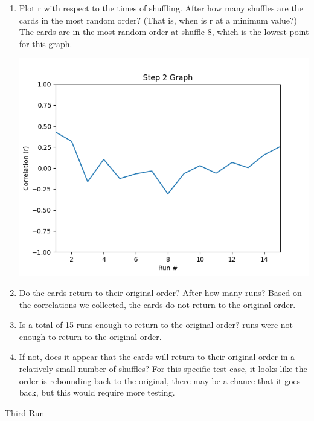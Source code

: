 \documentclass[12pt]{article}
\begin{document}
    \begin{enumerate}
        \item Plot r with respect to the times of shuffling. After how many shuffles are the cards 
        in the most random order? (That is, when is r at a minimum value?)
        \subitem The cards are in the most random order at shuffle 8, which is the lowest point for this graph.\\
        \begin{minipage}[t]{\linewidth}
            \centering
            {
              \includegraphics[width=.7\linewidth]{Figure_2.png}
            }
            \medskip       
        \end{minipage}
        \item Do the cards return to their original order?  After how many runs?
        \subitem Based on the correlations we collected, the cards do not return to the original order.
        \item Is a total of 15 runs enough to return to the original order?
         runs were not enough to return to the original order.
        \item If not, does it appear that the cards will return to their original order in a relatively 
        small number of shuffles?
        \subitem For this specific test case, it looks like the order is rebounding back to the original, 
                 there may be a chance that it goes back, but this would require more testing.
    \end{enumerate}
    \newpage
    \begin{center}
        \small Third Run
    \end{center}
\end{document}
